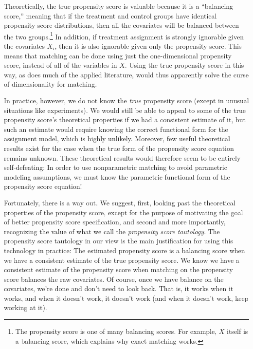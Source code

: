 \documentclass[11pt,titlepage]{article}
\begin{document}
Theoretically, the true propensity score is valuable because it is a
``balancing score,'' meaning that if the treatment and control groups
have identical propensity score distributions, then all the covariates
will be balanced between the two groups.\footnote{The propensity score
  is one of many balancing scores.  For example, $X$ itself is a
  balancing score, which explains why exact matching works.} In
addition, if treatment assignment is strongly ignorable given the
covariates $X_i$, then it is also ignorable given only the propensity
score.  This means that matching can be done using just the
one-dimensional propensity score, instead of all of the variables in
$X$.  Using the true propensity score in this way, as does much of the
applied literature, would thus apparently solve the curse of
dimensionality for matching.

In practice, however, we do not know the \emph{true} propensity score
(except in unusual situations like experiments).  We would still be
able to appeal to some of the true propensity score's theoretical
properties if we had a consistent estimate of it, but such an estimate
would require knowing the correct functional form for the assignment
model, which is highly unlikely.  Moreover, few useful theoretical
results exist for the case when the true form of the propensity score
equation remains unknown.  These theoretical results would therefore
seem to be entirely self-defeating: In order to use nonparametric
matching to avoid parametric modeling assumptions, we must know the
parametric functional form of the propensity score equation!

Fortunately, there is a way out.  We suggest, first, looking past the
theoretical properties of the propensity score, except for the purpose
of motivating the goal of better propensity score specification, and
second and more importantly, recognizing the value of what we call the
\emph{propensity score tautology}.  The propensity score tautology in
our view is the main justification for using this technology in
practice: The estimated propensity score is a balancing score when we
have a consistent estimate of the true propensity score.  We know we
have a consistent estimate of the propensity score when matching on
the propensity score balances the raw covariates.  Of course, once we
have balance on the covariates, we're done and don't need to look
back.  That is, it works when it works, and when it doesn't work, it
doesn't work (and when it doesn't work, keep working at it).
\end{document}
